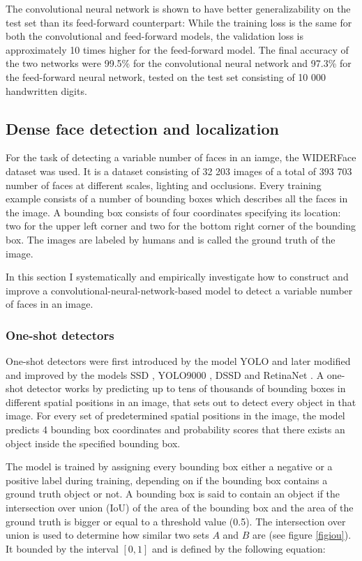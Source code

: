\documentclass[a4paper, twoside]{article}
\begin{document}
The convolutional neural network is shown to have better generalizability on the test set than its feed-forward counterpart: While the training loss is the same for both the convolutional and feed-forward models, the validation loss is approximately 10 times higher for the feed-forward model. The final accuracy of the two networks were 99.5\% for the convolutional neural network and 97.3\% for the feed-forward neural network, tested on the test set consisting of 10 000 handwritten digits. 


\subsection{Dense face detection and localization}
For the task of detecting a variable number of faces in an iamge, the WIDERFace dataset \cite{WIDERFace} was used. It is a dataset consisting of 32 203 images of a total of 393 703 number of faces at different scales, lighting and occlusions. Every training example consists of a number of bounding boxes which describes all the faces in the image. A bounding box consists of four coordinates specifying its location: two for the upper left corner and two for the bottom right corner of the bounding box. The images are labeled by humans and is called the ground truth of the image.

In this section I systematically and empirically investigate how to construct and improve a convolutional-neural-network-based model to detect a variable number of faces in an image.

\subsubsection{One-shot detectors}
One-shot detectors were first introduced by the model YOLO \cite{yolo} and later modified and improved by the models SSD \cite{ssd}, YOLO9000 \cite{yolo9000}, DSSD \cite{dssd} and RetinaNet \cite{retinanet}. A one-shot detector works by predicting up to tens of thousands of bounding boxes in different spatial positions in an image, that sets out to detect every object in that image. For every set of predetermined spatial positions in the image, the model predicts 4 bounding box coordinates and probability scores that there exists an object inside the specified bounding box.

The model is trained by assigning every bounding box either a negative or a positive label during training, depending on if the bounding box contains a ground truth object or not. A bounding box is said to contain an object if the intersection over union (IoU) \cite{iou} of the area of the bounding box and the area of the ground truth is bigger or equal to a threshold value (0.5). The intersection over union is used to determine how similar two sets $A$ and $B$ are (see figure \ref{figiou}). It bounded by the interval $[0,1]$ and is defined by the following equation: 
\end{document}
